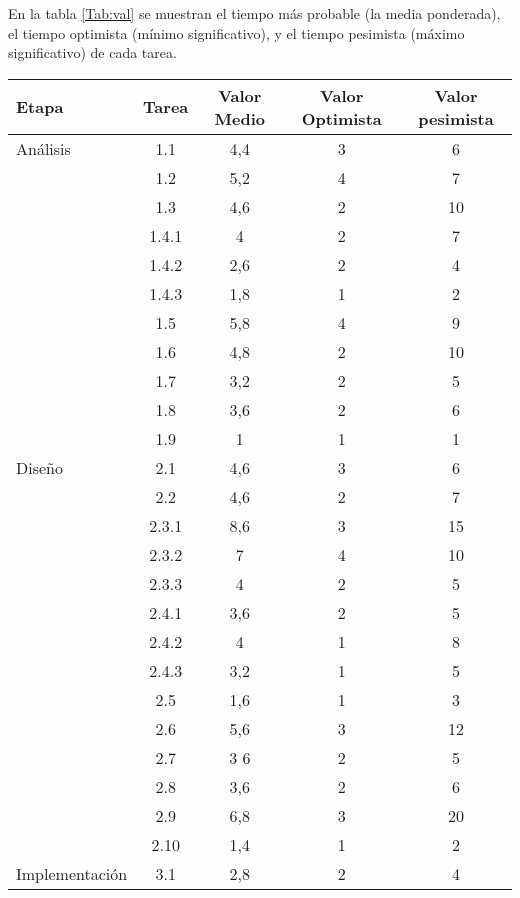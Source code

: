 \documentclass[11pt,a4paper,spanish,twoside]{report}
\begin{document}
En la tabla \ref{Tab:val} se muestran el tiempo más probable (la media
ponderada), el tiempo optimista (mínimo significativo), y el tiempo pesimista
(máximo significativo) de cada tarea.
\begin{table}[!h]
\centering
  \begin{tabular}{|p{2.5cm}|c|c|c|c|}
    \hline
    \textbf{Etapa} & \textbf{Tarea} & \textbf{Valor Medio} & \textbf{Valor
      Optimista} & \textbf{Valor pesimista}\\
    \hline \hline
    Análisis & 1.1 & 4,4 & 3 & 6\\
    \cline{2-5}
    & 1.2 & 5,2 & 4 & 7\\
    \cline{2-5}
    & 1.3 & 4,6 & 2 & 10\\
    \cline{2-5}
    & 1.4.1 & 4 & 2 & 7\\
    \cline{2-5}
    & 1.4.2 & 2,6 & 2 & 4\\
    \cline{2-5}
    & 1.4.3 & 1,8 & 1 & 2\\
    \cline{2-5}
    & 1.5 & 5,8 & 4 & 9\\
    \cline{2-5}
    & 1.6 & 4,8 & 2 & 10\\
    \cline{2-5}
    & 1.7 & 3,2 & 2 & 5\\
    \cline{2-5}
    & 1.8 & 3,6 & 2 & 6\\
    \cline{2-5}
    & 1.9 & 1 & 1 & 1\\
    \hline
    Diseño & 2.1 & 4,6 & 3 & 6\\
    \cline{2-5}
    & 2.2 & 4,6 & 2 & 7\\
    \cline{2-5}
    & 2.3.1 & 8,6 & 3 & 15\\
    \cline{2-5}
    & 2.3.2 & 7 & 4 & 10\\
    \cline{2-5}
    & 2.3.3 & 4 & 2 & 5\\
    \cline{2-5}
    & 2.4.1 & 3,6 & 2 & 5\\
    \cline{2-5}
    & 2.4.2 & 4 & 1 & 8\\
    \cline{2-5}
    & 2.4.3 & 3,2 & 1 & 5\\
    \cline{2-5}
    & 2.5 & 1,6 & 1 & 3\\
    \cline{2-5}
    & 2.6 & 5,6 & 3 & 12\\
    \cline{2-5}
    & 2.7 & 3 6 & 2 & 5\\
    \cline{2-5}
    & 2.8 & 3,6 & 2 & 6\\
    \cline{2-5}
    & 2.9 & 6,8 & 3 & 20\\
    \cline{2-5}
    & 2.10 & 1,4 & 1 & 2\\
    \hline
    Implementación & 3.1 & 2,8 & 2 & 4\\

\end{tabular}
\end{table}
\end{document}
